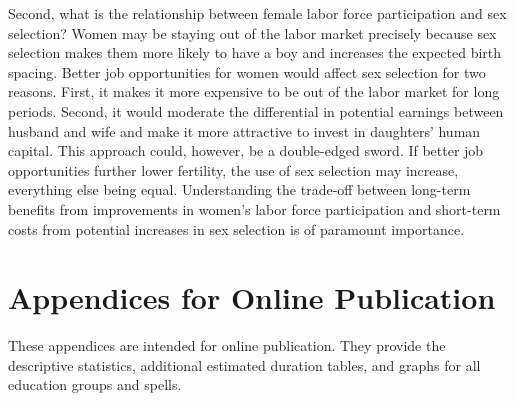 \documentclass[12pt,letterpaper]{article}
\begin{document}
Second, what is the relationship between female labor force participation and sex selection? 
Women may be staying out of the labor market precisely because sex selection makes 
them more likely to have a boy and increases the expected birth spacing. 
Better job opportunities for women would affect sex selection for two reasons. 
First, it makes it more expensive to be out of the labor market for long periods. 
Second, it would moderate the differential in potential earnings between husband and wife 
and make it more attractive to invest in daughters' human capital. 
This approach could, however, be a double-edged sword. 
If better job opportunities further lower fertility, the use of sex selection may increase, 
everything else being equal.
Understanding the trade-off between long-term benefits from improvements in women's labor 
force participation and short-term costs from potential increases in sex selection is of 
paramount importance.





\clearpage

\onehalfspacing






\clearpage
\newpage

\appendix

\renewcommand\thefigure{\thesection.\arabic{figure}}    
\renewcommand\thetable{\thesection.\arabic{table}}    

\section*{Appendices for Online Publication}

These appendices are intended for online publication.
They provide the descriptive statistics, additional
estimated duration tables, and graphs for all 
education groups and spells.

\clearpage
\newpage
\end{document}
